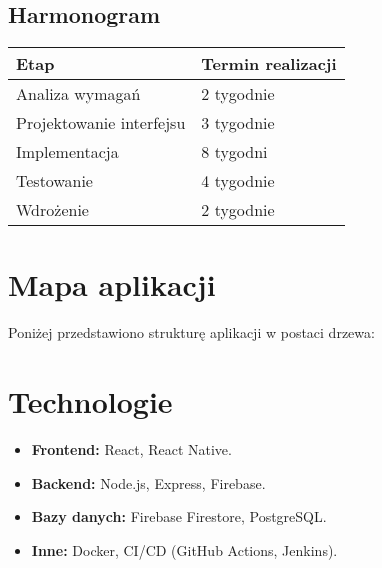 \subsection{Harmonogram}
\begin{tabular}{|l|l|}
    \hline
    \textbf{Etap} & \textbf{Termin realizacji} \\
    \hline
    Analiza wymagań & 2 tygodnie \\
    \hline
    Projektowanie interfejsu & 3 tygodnie \\
    \hline
    Implementacja & 8 tygodni \\
    \hline
    Testowanie & 4 tygodnie \\
    \hline
    Wdrożenie & 2 tygodnie \\
    \hline
\end{tabular}

\section{Mapa aplikacji}
Poniżej przedstawiono strukturę aplikacji w postaci drzewa:

\begin{center}
\end{center}

\section{Technologie}
\begin{itemize}
    \item \textbf{Frontend:} React, React Native.
    \item \textbf{Backend:} Node.js, Express, Firebase.
    \item \textbf{Bazy danych:} Firebase Firestore, PostgreSQL.
    \item \textbf{Inne:} Docker, CI/CD (GitHub Actions, Jenkins).
\end{itemize}

